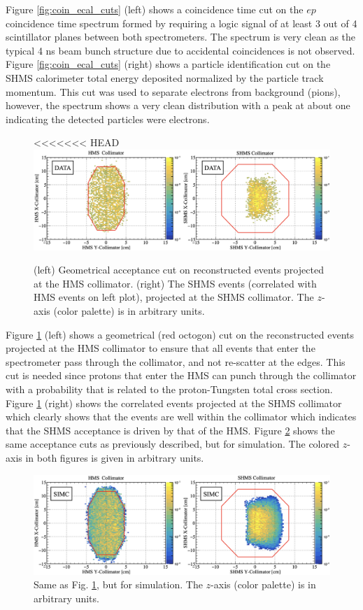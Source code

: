 \documentclass[aps, prl]{revtex4-2}  %
\begin{document}
\indent Figure \ref{fig:coin_ecal_cuts} (left) shows a coincidence time cut on the $ep$ coincidence time spectrum formed by requiring a logic signal of
at least 3 out of 4 scintillator planes between both spectrometers. The spectrum is very clean as the typical 4 ns beam bunch structure due to accidental
coincidences is not observed. Figure \ref{fig:coin_ecal_cuts} (right) shows a particle identification cut on the SHMS calorimeter total energy
deposited normalized by the particle track momentum. This cut was used to separate electrons from background (pions), however, the spectrum shows a very clean distribution
with a peak at about one indicating the detected particles were electrons.
\begin{figure}[!h]
<<<<<<< HEAD
\includegraphics[scale=0.24]{plots/collimator_CUT_80MeV_35deg_data.png}
\caption{(left) Geometrical acceptance cut on reconstructed events projected at the HMS collimator. (right) The SHMS events (correlated with HMS events on left plot),
  projected at the SHMS collimator. The $z$-axis (color palette) is in arbitrary units.}
\label{fig:data_coll_cuts}
\end{figure}
\clearpage
\indent Figure \ref{fig:data_coll_cuts} (left) shows a geometrical (red octogon) cut on the reconstructed events projected at the HMS collimator to ensure
that all events that enter the spectrometer pass through the collimator, and not re-scatter at the edges. This cut is needed since protons that enter the
HMS can punch through the collimator with a probability that is related to the proton-Tungsten total cross section. Figure \ref{fig:data_coll_cuts} (right)
shows the correlated events projected at the SHMS collimator which clearly shows that the events are well within the collimator which indicates that the SHMS
acceptance is driven by that of the HMS. Figure \ref{fig:simc_coll_cuts} shows the same acceptance cuts as previously described, but for simulation. The colored
$z$-axis in both figures is given in arbitrary units.\\
\begin{figure}[!h]
\includegraphics[scale=0.25]{plots/collimator_CUT_80MeV_35deg_SIMC.png}
\caption{Same as Fig. \ref{fig:data_coll_cuts}, but for simulation.  The $z$-axis (color palette) is in arbitrary units.}
\label{fig:simc_coll_cuts}
\end{figure}
\end{document}
